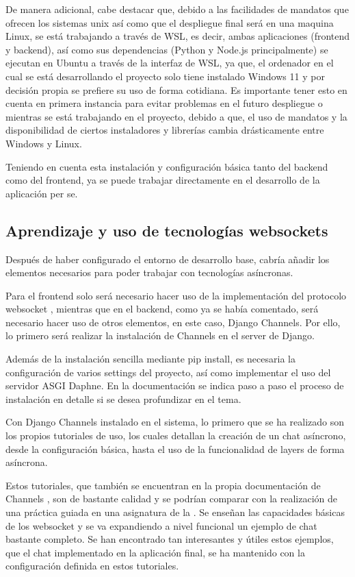 De manera adicional, cabe destacar que, debido a las facilidades de mandatos que ofrecen los sistemas unix así como que el despliegue
final será en una maquina Linux, se está trabajando a través de WSL, es decir,
ambas aplicaciones (frontend y backend), así como sus dependencias (Python y Node.js principalmente) se ejecutan en Ubuntu a través de la interfaz
de WSL, ya que, el ordenador en el cual se está desarrollando el proyecto solo tiene instalado Windows 11 y por decisión propia se prefiere su uso de forma
cotidiana. Es importante tener esto en cuenta en primera instancia para evitar problemas en el futuro despliegue o mientras se está trabajando en el proyecto,
debido a que, el uso de mandatos y la disponibilidad de ciertos instaladores y librerías cambia drásticamente entre Windows y Linux.

Teniendo en cuenta esta instalación y configuración básica tanto del backend como del frontend, ya se puede trabajar directamente en el desarrollo de
la aplicación per se.

\subsection{Aprendizaje y uso de tecnologías websockets} 

Después de haber configurado el entorno de desarrollo base, cabría añadir los elementos necesarios para poder 
trabajar con tecnologías asíncronas.

Para el frontend solo será necesario hacer uso de la implementación del protocolo websocket \cite{websocketMDN}, mientras que en el 
backend, como ya se había comentado, será necesario hacer uso de otros elementos, en este caso, Django Channels. 
Por ello, lo primero será realizar la instalación de Channels en el server de Django.

Además de la instalación sencilla mediante pip install, es necesaria la configuración de varios settings del proyecto, así
como implementar el uso del servidor ASGI Daphne. En la documentación \cite{djangoChannelsInstall} se indica paso a paso el proceso 
de instalación en detalle si se desea profundizar en el tema.

Con Django Channels instalado en el sistema, lo primero que se ha realizado son los propios tutoriales de uso, los cuales detallan 
la creación de un chat asíncrono, desde la configuración básica, hasta el uso de la funcionalidad de layers de forma asíncrona.

Estos tutoriales, que también se encuentran en la propia documentación de Channels \cite{djangoChannelsTutorial}, son 
de bastante calidad y se podrían comparar con la realización de una práctica guiada en una asignatura de la 
\escuelalargo. Se enseñan las capacidades básicas de los websocket y se va expandiendo a nivel funcional un ejemplo
de chat bastante completo. Se han encontrado tan interesantes y útiles estos ejemplos, que el chat implementado
en la aplicación final, se ha mantenido con la configuración definida en estos tutoriales.

